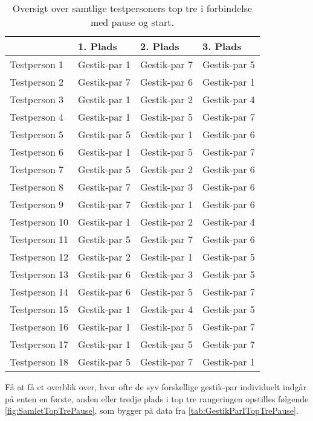 \begin{table}[H]
	\centering
	\begin{tabular}{ | p{3cm} | p{3cm} | p{3cm} | p{3cm} |}
	\hline
		 & 1. Plads & 2. Plads & 3. Plads \\ \hline
		Testperson 1 & Gestik-par 1 & Gestik-par 7 & Gestik-par 5 \\ \hline
		Testperson 2 & Gestik-par 7 & Gestik-par 6 & Gestik-par 1 \\ \hline
		Testperson 3 & Gestik-par 1 & Gestik-par 2 & Gestik-par 4 \\ \hline
		Testperson 4 & Gestik-par 1 & Gestik-par 5 & Gestik-par 7 \\ \hline
		Testperson 5 & Gestik-par 5 & Gestik-par 1 & Gestik-par 6 \\ \hline
		Testperson 6 & Gestik-par 1 & Gestik-par 5 & Gestik-par 7 \\ \hline 
		Testperson 7 & Gestik-par 5 & Gestik-par 2 & Gestik-par 6 \\ \hline
		Testperson 8 & Gestik-par 7 & Gestik-par 3 & Gestik-par 6 \\ \hline
		Testperson 9 & Gestik-par 7 & Gestik-par 1 & Gestik-par 6 \\ \hline
		Testperson 10 & Gestik-par 1 & Gestik-par 2 & Gestik-par 4 \\ \hline
		Testperson 11 & Gestik-par 5 & Gestik-par 7 & Gestik-par 6 \\ \hline
		Testperson 12 & Gestik-par 2 & Gestik-par 1 & Gestik-par 5 \\ \hline
		Testperson 13 & Gestik-par 6 & Gestik-par 3 & Gestik-par 5 \\ \hline
		Testperson 14 & Gestik-par 6 & Gestik-par 5 & Gestik-par 7 \\ \hline
		Testperson 15 & Gestik-par 1 & Gestik-par 4 & Gestik-par 5 \\ \hline
		Testperson 16 & Gestik-par 1 & Gestik-par 5 & Gestik-par 7 \\ \hline
		Testperson 17 & Gestik-par 1 & Gestik-par 5 & Gestik-par 7 \\ \hline
		Testperson 18 & Gestik-par 5 & Gestik-par 7 & Gestik-par 1 \\ \hline
	\end{tabular}
	\caption{Oversigt over samtlige testpersoners top tre i forbindelse med pause og start.}
	\label{tab:GestikParITopTrePause}
\end{table}
\noindent
%
Få at få et overblik over, hvor ofte de syv forskellige gestik-par individuelt indgår på enten en første, anden eller tredje plads i top tre rangeringen opstilles følgende \autoref{fig:SamletTopTrePause}, som bygger på data fra \autoref{tab:GestikParITopTrePause}. 

